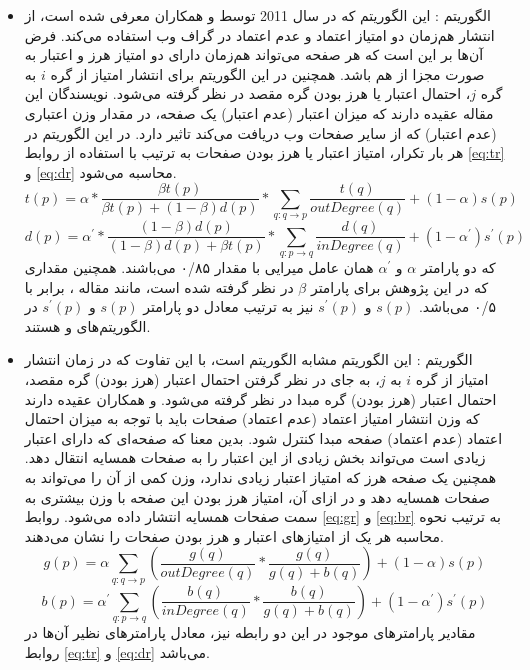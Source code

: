 \documentclass[twoside, a4paper,11pt]{book}
\numberwithin{equation}{chapter}
\numberwithin{table}{chapter}
\numberwithin{figure}{chapter}
\numberwithin{equation}{chapter}
\begin{document}
\begin{itemize}
\item
الگوریتم : این الگوریتم که در سال 2011 توسط  و همکاران \cite{zhang2011propagating} معرفی شده است، از انتشار هم‌زمان دو امتیاز اعتماد و عدم اعتماد در گراف وب استفاده می‌کند. فرض آن‌ها بر این است که هر صفحه می‌تواند هم‌زمان دارای دو امتیاز هرز و اعتبار به صورت مجزا از هم باشد. همچنین در این الگوریتم برای انتشار امتیاز از گره $i$ به گره $j$، احتمال اعتبار یا هرز بودن گره مقصد در نظر گرفته می‌شود. نویسندگان این مقاله عقیده دارند که میزان اعتبار (عدم اعتبار) یک صفحه، در مقدار وزن اعتباری (عدم اعتبار) که از سایر صفحات وب دریافت می‌کند تاثیر دارد. در این الگوریتم در هر بار تکرار، امتیاز اعتبار یا هرز بودن صفحات به ترتیب با استفاده از روابط \ref{eq:tr} و \ref{eq:dr} محاسبه می‌شود.
\begin{equation}
t(p) = \alpha * \frac{\beta t(p)}{\beta t(p)+(1-\beta)d(p)}* \sum_{q:q\to p}\frac{t(q)}{outDegree(q)} + (1-\alpha)s(p)
	\label{eq:tr}
\end{equation}
\begin{equation}
d(p) = \alpha ^\prime *\frac{(1-\beta) d(p)}{(1-\beta)d(p)+\beta t(p)}*\sum_{q:p\to q} \frac{d(q)}{inDegree(q)} + (1-\alpha ^\prime)s^\prime(p)
	\label{eq:dr}
\end{equation}
که دو پارامتر $\alpha$ و  $\alpha^\prime$ همان عامل میرایی با مقدار ۰/۸۵ می‌باشند. همچنین مقداری که در این پژوهش برای پارامتر $\beta$ در نظر گرفته شده است، مانند مقاله \cite{zhang2011propagating}، برابر با ۰/۵ می‌باشد. $s(p)$ و $s^\prime(p)$ نیز به ترتیب معادل دو پارامتر $s(p)$ و $s^\prime(p)$ در الگوریتم‌های  و   هستند.
\item
الگوریتم : این الگوریتم مشابه الگوریتم  است، با این تفاوت که در زمان انتشار امتیاز از گره $i$ به $j$، به جای در نظر گرفتن احتمال اعتبار (هرز بودن) گره مقصد، احتمال اعتبار (هرز بودن) گره مبدا در نظر گرفته می‌شود.  و همکاران \cite{liu2013combating} عقیده دارند که وزن انتشار امتیاز اعتماد (عدم اعتماد) صفحات باید با توجه به میزان احتمال اعتماد (عدم اعتماد) صفحه مبدا کنترل شود. بدین معنا که صفحه‌ای که دارای اعتبار زیادی است می‌تواند بخش زیادی از این اعتبار را به صفحات همسایه انتقال دهد. همچنین یک صفحه هرز که امتیاز اعتبار زیادی ندارد، وزن کمی از آن را می‌تواند به صفحات همسایه دهد و در ازای آن، امتیاز هرز بودن این صفحه با وزن بیشتری به سمت صفحات همسایه انتشار داده می‌شود. روابط \ref{eq:gr} و \ref{eq:br} به ترتیب نحوه محاسبه هر یک از امتیازهای اعتبار و هرز بودن صفحات را نشان می‌دهند.
\begin{equation}
g(p) = \alpha \sum_{q:q\to p} \left( \frac{g(q)}{outDegree(q)}*\frac{g(q)}{g(q)+b(q)} \right) + (1-\alpha) s(p)
\label{eq:gr}
\end{equation}
\begin{equation}
b(p) = \alpha ^\prime \sum_{q:p \to q} \left( \frac{b(q)}{inDegree(q)}*\frac{b(q)}{g(q)+b(q)} \right) + (1-\alpha ^\prime) s^\prime (p)
\label{eq:br}
\end{equation}
مقادیر پارامترهای موجود در این دو رابطه نیز، معادل پارامترهای نظیر آن‌ها در روابط \ref{eq:tr} و \ref{eq:dr} می‌باشد.
\end{itemize}
\end{document}
